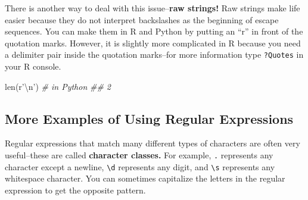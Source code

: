 \documentclass[12pt,krantz2]{krantz}
\makeatletter
\newenvironment{Shaded}{\begin{snugshade}}{\end{snugshade}}
\newcommand{\BuiltInTok}[1]{#1}
\newcommand{\CommentTok}[1]{\textcolor[rgb]{0.37,0.37,0.37}{\textit{#1}}}
\newcommand{\KeywordTok}[1]{\textcolor[rgb]{0.27,0.27,0.27}{\textbf{#1}}}
\newcommand{\NormalTok}[1]{#1}
\newcommand{\StringTok}[1]{\textcolor[rgb]{0.5,0.5,0.5}{#1}}
\newcommand{\VerbatimStringTok}[1]{\textcolor[rgb]{0.5,0.5,0.5}{#1}}
\newenvironment{kframe}{%
\medskip{}
\setlength{\fboxsep}{.8em}
 \def\at@end@of@kframe{}%
 \ifinner\ifhmode%
  \def\at@end@of@kframe{\end{minipage}}%
  \begin{minipage}{\columnwidth}%
 \fi\fi%
 \def\FrameCommand##1{\hskip\@totalleftmargin \hskip-\fboxsep
 \colorbox{shadecolor}{##1}\hskip-\fboxsep
     \hskip-\linewidth \hskip-\@totalleftmargin \hskip\columnwidth}%
 \MakeFramed {\advance\hsize-\width
   \@totalleftmargin\z@ \linewidth\hsize
   \@setminipage}}%
 {\par\unskip\endMakeFramed%
 \at@end@of@kframe}
\renewenvironment{Shaded}{\begin{kframe}}{\end{kframe}}
\makeatother
\begin{document}
\begin{Shaded}
\end{Shaded}

\begin{Shaded}
\end{Shaded}

There is another way to deal with this issue--\textbf{raw strings!} Raw strings make life easier because they do not interpret backslashes as the beginning of escape sequences. You can make them in R and Python by putting an ``r'' in front of the quotation marks. However, it is slightly more complicated in R because you need a delimiter pair inside the quotation marks--for more information type \texttt{?Quotes} in your R console.

\begin{Shaded}
\begin{Highlighting}[]
\BuiltInTok{len}\NormalTok{(}\VerbatimStringTok{r'\textbackslash{}n'}\NormalTok{) }\CommentTok{# in Python }
\CommentTok{## 2}
\end{Highlighting}
\end{Shaded}

\begin{Shaded}
\end{Shaded}

\hypertarget{more-examples-of-using-regular-expressions}{%
\subsection{More Examples of Using Regular Expressions}\label{more-examples-of-using-regular-expressions}}

Regular expressions that match many different types of characters are often very useful--these are called \textbf{character classes.} For example, \texttt{.} represents any character except a newline, \texttt{\textbackslash{}d} represents any digit, and \texttt{\textbackslash{}s} represents any whitespace character. You can sometimes capitalize the letters in the regular expression to get the opposite pattern.
\end{document}
